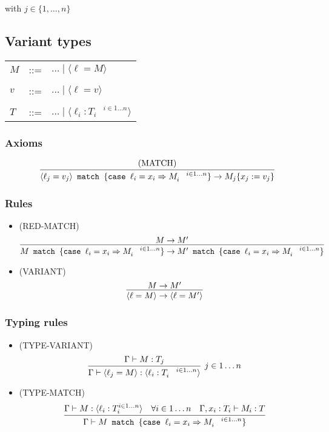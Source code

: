 \documentclass[11pt]{article}
\newcommand{\subs}[2]{\ensuremath{\{ #1 := #2 \}}}
\newcommand{\type}[2]{\ensuremath{ #1 : #2 }}
\newcommand{\var}[1]{\ensuremath{ \langle #1 \rangle }}
\newcommand{\match}[2]{\ensuremath{ #1 \texttt{ match }\{ #2 \} }}
\newcommand{\case}[3]{\ensuremath{ \texttt{case } #1 = #2 \Rightarrow #3}}
\begin{document}
with \(j \in \{1, \dots, n\}\)

\subsection*{Variant types}
\label{sec:orgacb4f53}
\begin{center}
\begin{tabular}{lcl}
\(M\) & ::= & \(\dots \mid \var{\ell = M}\)\\
 &  & \\
\(v\) & ::= & \(\dots \mid \var{\ell = v}\)\\
 &  & \\
\(T\) & ::= & \(\dots \mid \var{\type{\ell_i}{T_i}^{\quad i\in 1\dots n}}\)\\
\end{tabular}

\end{center}

\subsubsection*{Axioms}
\label{sec:orgf6c0af2}
\[\infer{\match{\var{\ell_j =
    v_j}}{\case{\ell_i}{x_i}{M_i}^{\quad i \in 1\dots n}}\to
    M_j\subs{x_j}{v_j}}{\text{(MATCH)}}\]
\subsubsection*{Rules}
\label{sec:org3de8fb5}
\begin{itemize}
\item (RED-MATCH) \[\infer{\match{M}{\case{\ell_i}{x_i}{M_i}^{\quad i
      \in 1\dots n}}\to \match{M'}{\case{\ell_i}{x_i}{M_i}^{\quad i
      \in 1\dots n}} }{M\to M'}\]
\item (VARIANT) \[\infer{\var{\ell = M} \to \var{\ell = M'}}{M\to
      M'}\]
\end{itemize}
\subsubsection*{Typing rules}
\label{sec:org9a9f59a}
\begin{itemize}
\item (TYPE-VARIANT) \[\infer[j\in 1 \dots n]{\Gamma \vdash
      \type{\var{\ell_j = M}}{\var{\type{\ell_i}{T_i}^{\quad i \in 1
      \dots n}}}}{\Gamma \vdash \type{M}{T_j}}\]
\item (TYPE-MATCH)
\[\infer{\Gamma\vdash\match{M}{\case{\ell_i}{x_i}{M_i}^{\quad i
      \in 1\dots n}}}{\Gamma\vdash
      \type{M}{\var{\type{\ell_i}{T_i}^{i\in 1\dots n}}} & \forall i
      \in 1 \dots n\quad \Gamma, \type{x_i}{T_i}\vdash
      \type{M_i}{T}}\]
\end{itemize}
\end{document}
